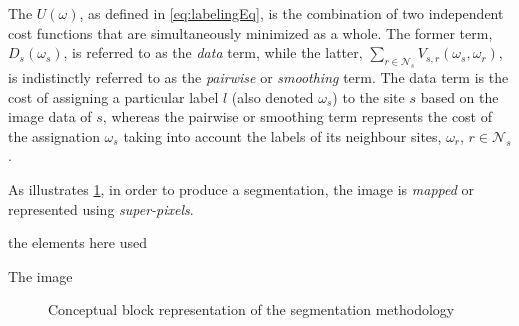 The $U(\omega)$, as defined in \cref{eq:labelingEq}, is the combination of two independent cost functions that are simultaneously minimized as a whole. The former term, $D_s(\omega_s)$, is referred to as the \emph{data} term, while the latter, $\sum_{r \in \mathcal{N}_{s}} V_{s,r}(\omega_s,\omega_r)$, is indistinctly referred to as the \emph{pairwise} or \emph{smoothing} term.
 The data term is the cost of assigning a particular label $l$ (also denoted $\omega_s$) to the site $s$ based on the image data of $s$, whereas the pairwise or smoothing term represents the cost of the assignation $\omega_s$ taking into account the labels of its neighbour sites, $\omega_r$, $r \in \mathcal{N}_{s}$. 

As illustrates \cref{fig:method}, in order to produce a segmentation, the image is \emph{mapped} or represented using \emph{super-pixels}. 

the elements here used 

 The image 
%
%
%
%
\begin{figure}[htpb]
  \centering
  \caption{Conceptual block representation of the segmentation methodology}
  \label{fig:method}
\end{figure}

